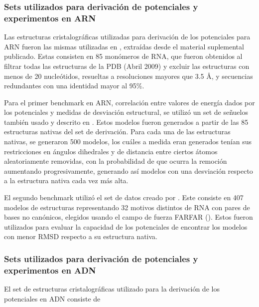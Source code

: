 \subsubsection{Sets utilizados para derivación de potenciales y experimentos en ARN}
\par
Las estructuras cristalográficas utilizadas para derivación de los potenciales para ARN fueron las mismas utilizadas en \cite{Capriotti2011}, extraídas desde el material suplemental publicado.
Estas consisten en 85 monómeros de RNA, que fueron obtenidos al filtrar todas las estructuras de la PDB (Abril 2009) y excluir las estructuras con menos de 20 nucleótidos, resueltas a resoluciones mayores que 3.5 \si{\angstrom}, y secuencias redundantes con una identidad mayor al 95\%.
\par
Para el primer benchmark en ARN, correlación entre valores de energía dados por los potenciales y medidas de desviación estructural, se utilizó un set de señuelos también usado y descrito en \cite{Capriotti2011}.
Estos modelos fueron generados a partir de las 85 estructuras nativas del set de derivación. 
Para cada una de las estructuras nativas, se generaron 500 modelos, los cuáles a medida eran generados tenían sus restricciones en ángulos dihedrales y de distancia entre ciertos átomos aleatoriamente removidas, con la probabilidad de que ocurra la remoción aumentando progresivamente, generando así modelos con una desviación respecto a la estructura nativa cada vez más alta.
\par
El segundo benchmark utilizó el set de datos creado por \cite{Das2010}. 
Este consiste en 407 modelos de estructuras representando 32 motivos distintos de RNA con pares de bases no canónicos, elegidos usando el campo de fuerza FARFAR (\cite{Das2010}). 
Estos fueron utilizados para evaluar la capacidad de los potenciales de encontrar los modelos con menor RMSD respecto a su estructura nativa.
\subsubsection{Sets utilizados para derivación de potenciales y experimentos en ADN}
\par
El set de estructuras cristalográficas utilizado para la derivación de los potenciales en ADN consiste de 

